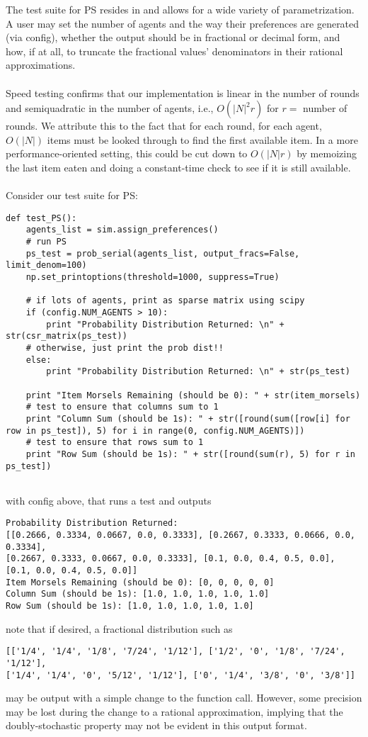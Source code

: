\documentclass[12pt]{article}
\begin{document}
The test suite for PS resides in  and allows for a wide variety of parametrization. A user may set the number of agents and the way their preferences are generated (via config), whether the output should be in fractional or decimal form, and how, if at all, to truncate the fractional values' denominators in their rational approximations.\\\\Speed testing confirms that our implementation is linear in the number of rounds and semiquadratic in the number of agents, i.e., $O(|N|^2r)$ for $r=$ number of rounds. We attribute this to the fact that for each round, for each agent, $O(|N|)$ items must be looked through to find the first available item. In a more performance-oriented setting, this could be cut down to $O(|N|r)$ by memoizing the last item eaten and doing a constant-time check to see if it is still available.\\\\Consider our test suite for PS: 
\begin{verbatim} 
def test_PS(): 
    agents_list = sim.assign_preferences() 
    # run PS 
    ps_test = prob_serial(agents_list, output_fracs=False, limit_denom=100) 
    np.set_printoptions(threshold=1000, suppress=True) 
 
    # if lots of agents, print as sparse matrix using scipy 
    if (config.NUM_AGENTS > 10): 
        print "Probability Distribution Returned: \n" + str(csr_matrix(ps_test)) 
    # otherwise, just print the prob dist!! 
    else: 
        print "Probability Distribution Returned: \n" + str(ps_test) 
 
    print "Item Morsels Remaining (should be 0): " + str(item_morsels) 
    # test to ensure that columns sum to 1 
    print "Column Sum (should be 1s): " + str([round(sum([row[i] for row in ps_test]), 5) for i in range(0, config.NUM_AGENTS)]) 
    # test to ensure that rows sum to 1 
    print "Row Sum (should be 1s): " + str([round(sum(r), 5) for r in ps_test]) 
 
\end{verbatim} 
\noindent with config above, that runs a test and outputs 
 
\begin{verbatim} 
Probability Distribution Returned:  
[[0.2666, 0.3334, 0.0667, 0.0, 0.3333], [0.2667, 0.3333, 0.0666, 0.0, 0.3334], 
[0.2667, 0.3333, 0.0667, 0.0, 0.3333], [0.1, 0.0, 0.4, 0.5, 0.0],  
[0.1, 0.0, 0.4, 0.5, 0.0]] 
Item Morsels Remaining (should be 0): [0, 0, 0, 0, 0] 
Column Sum (should be 1s): [1.0, 1.0, 1.0, 1.0, 1.0] 
Row Sum (should be 1s): [1.0, 1.0, 1.0, 1.0, 1.0] 
\end{verbatim} 
\noindent note that if desired, a fractional distribution such as  
\begin{verbatim} 
[['1/4', '1/4', '1/8', '7/24', '1/12'], ['1/2', '0', '1/8', '7/24', '1/12'], 
['1/4', '1/4', '0', '5/12', '1/12'], ['0', '1/4', '3/8', '0', '3/8']] 
\end{verbatim} 
\noindent may be output with a simple change to the function call. However, some precision may be lost during the change to a rational approximation, implying that the doubly-stochastic property may not be evident in this output format. 
\end{document}
